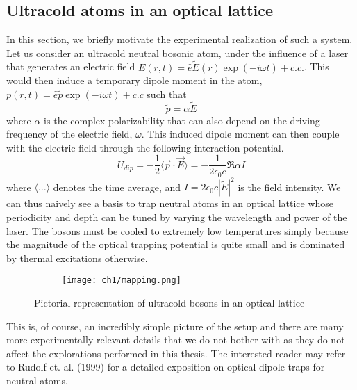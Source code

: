 \subsection*{Ultracold atoms in an optical lattice}
In this section, we briefly motivate the experimental realization of such a system. Let us consider an ultracold neutral bosonic atom, under the influence of a laser that generates an electric field $E(r, t) = \hat{e}\tilde E(r) \exp(-i\omega t) + c.c.$. This would then induce a temporary dipole moment in the atom, $p(r, t) = \hat{e}\tilde p \exp(-i\omega t) + c.c$ such that
\begin{equation*}
    \tilde p = \alpha \tilde E
\end{equation*}
where $\alpha$ is the complex polarizability that can also depend on the driving frequency of the electric field, $\omega$. This induced dipole moment can then couple with the electric field through the following interaction potential.
\begin{equation*}
    U_{dip} = -\frac{1}{2}\langle \vec{p} \cdot \vec{E}\rangle = -\frac{1}{2\epsilon_0 c}\Re{\alpha}I
\end{equation*}
where $\langle\dots\rangle$ denotes the time average, and $I = 2\epsilon_0 c|\tilde E|^2$ is the field intensity. We can thus naively see a basis to trap neutral atoms in an optical lattice whose periodicity and depth can be tuned by varying the wavelength and power of the laser. The bosons must be cooled to extremely low temperatures simply because the magnitude of the optical trapping potential is quite small and is dominated by thermal excitations otherwise. 

\begin{figure}[!htb]
    \centering
    \begin{subfigure}[b]{\textwidth}  %
        \centering
        \texttt{[image: ch1/mapping.png]}
    \end{subfigure}
    \caption{Pictorial representation of ultracold bosons in an optical lattice}
    \label{fig:optical_lattice}
\end{figure}
\FloatBarrier \!\!\!\!\!\!\!\!\!\!\!

This is, of course, an incredibly simple picture of the setup and there are many more experimentally relevant details that we do not bother with as they do not affect the explorations performed in this thesis. The interested reader may refer to Rudolf et. al. (1999)\cite{grimm1999optical} for a detailed exposition on optical dipole traps for neutral atoms.

